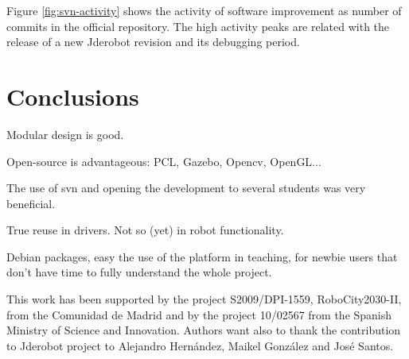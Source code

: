 \documentclass[twocolumn]{svjour3}          %
\begin{document}
Figure \ref{fig:svn-activity} shows the activity of software improvement as number of commits in the official repository. The high activity peaks are related with the release of a new Jderobot revision and its debugging period.

\section{Conclusions}

Modular design is good.

Open-source is advantageous: PCL, Gazebo, Opencv, OpenGL...

The use of svn and opening the development to several students was very beneficial.

True reuse in drivers. Not so (yet) in robot functionality.

Debian packages, easy the use of the platform in teaching, for newbie users that don't have time to fully understand the whole project.


\begin{acknowledgements}
This work has been supported by the project S2009/DPI-1559, RoboCity2030-II, from the Comunidad de Madrid and by the project 10/02567 from the Spanish Ministry of Science and Innovation. Authors want also to thank the contribution to Jderobot project to Alejandro Hernández, Maikel González and José Santos.
\end{acknowledgements}

\end{document}
